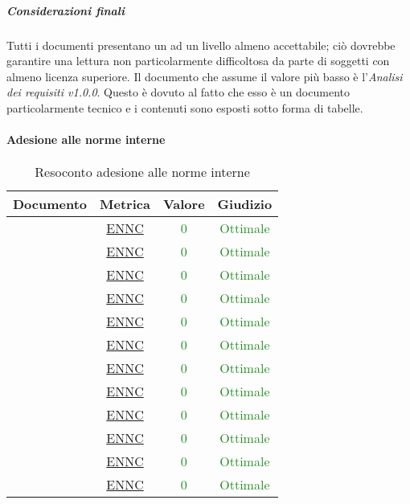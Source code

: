						\subparagraph{Considerazioni finali}
						Tutti i documenti presentano un  ad un livello almeno accettabile; ciò dovrebbe garantire una lettura non particolarmente difficoltosa da parte di soggetti con almeno licenza superiore.
						Il documento che assume il valore più basso è l'\textit{Analisi dei requisiti v1.0.0}. Questo è dovuto al fatto che esso è un documento particolarmente tecnico e i contenuti sono esposti sotto forma di tabelle.	
					\paragraph{Adesione alle norme interne}
						\begin{table}[H]
							\centering
							\small
							\begin{tabular}{c | c | c | c}
								\hline
								\textbf{Documento} & \textbf{Metrica} & \textbf{Valore} & \textbf{Giudizio} \\
								\hline
								\pdpv & \hyperref[MAANI]{ENNC} & \textcolor{ForestGreen}{0} & \textcolor{ForestGreen}{Ottimale} \\
								\pdqv & \hyperref[MAANI]{ENNC} & \textcolor{ForestGreen}{0} & \textcolor{ForestGreen}{Ottimale}\\
								\ndpv & \hyperref[MAANI]{ENNC} &\textcolor{ForestGreen}{0} & \textcolor{ForestGreen}{Ottimale}\\
								\sdfv & \hyperref[MAANI]{ENNC} & \textcolor{ForestGreen}{0} & \textcolor{ForestGreen}{Ottimale}\\
								\adrv & \hyperref[MAANI]{ENNC} & \textcolor{ForestGreen}{0} & \textcolor{ForestGreen}{Ottimale}\\
								\glv  & \hyperref[MAANI]{ENNC} & \textcolor{ForestGreen}{0} & \textcolor{ForestGreen}{Ottimale}\\
								\vunoi& \hyperref[MAANI]{ENNC} & \textcolor{ForestGreen}{0} & \textcolor{ForestGreen}{Ottimale}\\
								\vduei& \hyperref[MAANI]{ENNC} & \textcolor{ForestGreen}{0} & \textcolor{ForestGreen}{Ottimale}\\
								\vtrei & \hyperref[MAANI]{ENNC} & \textcolor{ForestGreen}{0} & \textcolor{ForestGreen}{Ottimale}\\
								\vquattroi & \hyperref[MAANI]{ENNC} & \textcolor{ForestGreen}{0} & \textcolor{ForestGreen}{Ottimale}\\
								\vunoe & \hyperref[MAANI]{ENNC} & \textcolor{ForestGreen}{0} & \textcolor{ForestGreen}{Ottimale}\\
								\vduee & \hyperref[MAANI]{ENNC} & \textcolor{ForestGreen}{0} & \textcolor{ForestGreen}{Ottimale}\\
								\hline
							\end{tabular}
							\caption{Resoconto adesione alle norme interne}
							\label{tab_resoconto_adesione_alle_norme_interne}
						\end{table}
					
